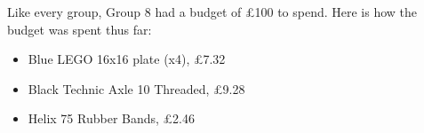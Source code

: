 Like every group, Group 8 had a budget of £100 to spend. Here is how the budget was spent thus far:
\begin{itemize}
  \itemsep0em 
  \item Blue LEGO 16x16 plate (x4), \pounds 7.32
  \item Black Technic Axle 10 Threaded, \pounds 9.28
  \item Helix 75 Rubber Bands, \pounds 2.46
\end{itemize}